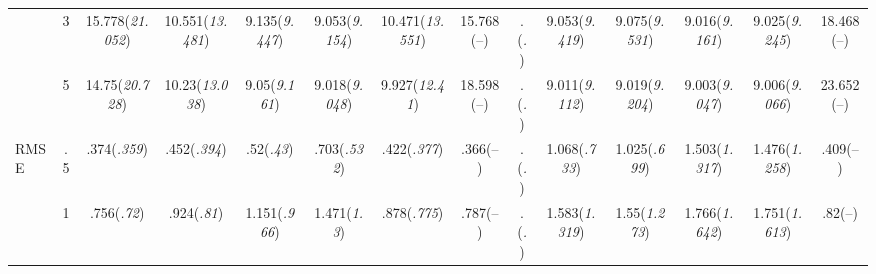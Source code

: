 \documentclass{article}
\begin{document}
\begin{table}[tbp]
{\begin{tabularx}{\textwidth}{lCCCCCCCCCCCCC}
&3&15.778\newline (\emph{21.052})&10.551\newline (\emph{13.481})&9.135\newline (\emph{9.447})&9.053\newline (\emph{9.154})&10.471\newline (\emph{13.551})&15.768\newline (--)&.\newline (\emph{.})&9.053\newline (\emph{9.419})&9.075\newline (\emph{9.531})&9.016\newline (\emph{9.161})&9.025\newline (\emph{9.245})&18.468\newline (--) \tabularnewline
&5&14.75\newline (\emph{20.728})&10.23\newline (\emph{13.038})&9.05\newline (\emph{9.161})&9.018\newline (\emph{9.048})&9.927\newline (\emph{12.41})&18.598\newline (--)&.\newline (\emph{.})&9.011\newline (\emph{9.112})&9.019\newline (\emph{9.204})&9.003\newline (\emph{9.047})&9.006\newline (\emph{9.066})&23.652\newline (--) \tabularnewline
\midrule RMSE&.5&.374\newline (\emph{.359})&.452\newline (\emph{.394})&.52\newline (\emph{.43})&.703\newline (\emph{.532})&.422\newline (\emph{.377})&.366\newline (--)&.\newline (\emph{.})&1.068\newline (\emph{.733})&1.025\newline (\emph{.699})&1.503\newline (\emph{1.317})&1.476\newline (\emph{1.258})&.409\newline (--) \tabularnewline
&1&.756\newline (\emph{.72})&.924\newline (\emph{.81})&1.151\newline (\emph{.966})&1.471\newline (\emph{1.3})&.878\newline (\emph{.775})&.787\newline (--)&.\newline (\emph{.})&1.583\newline (\emph{1.319})&1.55\newline (\emph{1.273})&1.766\newline (\emph{1.642})&1.751\newline (\emph{1.613})&.82\newline (--) \tabularnewline

\end{tabularx}}
\end{table}
\end{document}

